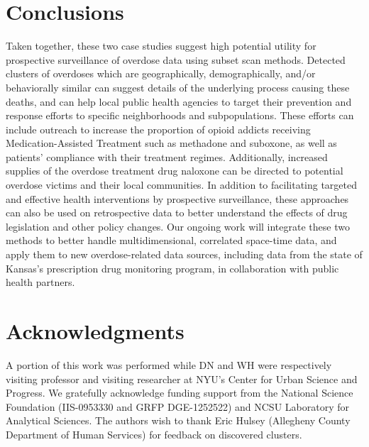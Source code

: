 \documentclass{acm_proc_article-sp}
\begin{document}
\section{Conclusions}
\label{sec:conclusions}

Taken together, these two case studies suggest high potential utility 
for prospective surveillance of overdose data using subset scan methods.  
Detected clusters of overdoses which are geographically, 
demographically, and/or behaviorally similar can suggest details of the 
underlying process causing these deaths, and can help local public 
health agencies to target their prevention and response efforts to 
specific neighborhoods and subpopulations.  These efforts can include 
outreach to increase the proportion of opioid addicts receiving 
Medication-Assisted Treatment such as methadone and suboxone, as well as 
patients' compliance with their treatment regimes. Additionally, 
increased supplies of the overdose treatment drug naloxone can be 
directed to potential overdose victims and their local communities.  In 
addition to facilitating targeted and effective health interventions by 
prospective surveillance, these approaches can also be used on 
retrospective data to better understand the effects of drug 
legislation and other policy changes.  Our ongoing work will integrate 
these two methods to better handle multidimensional, correlated 
space-time data, and apply them to new overdose-related data sources, 
including data from the state of Kansas's prescription drug monitoring 
program, in collaboration with public health partners.

\section{Acknowledgments}

A portion of this work was performed while DN and WH were respectively 
visiting professor and visiting researcher at NYU's Center for Urban 
Science and Progress.  We gratefully acknowledge funding support from 
the National Science Foundation (IIS-0953330 and GRFP DGE-1252522) and 
NCSU Laboratory for Analytical Sciences.  The authors wish to thank Eric 
Hulsey (Allegheny County Department of Human Services) for feedback on 
discovered clusters.

\nocite{*}


\end{document}
